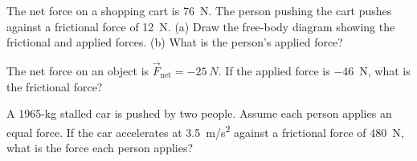 \documentclass{article}
\begin{document}
\begin{center}
\end{center}


\begin{exercise} \label{lqMcA5}
The net force on a shopping cart is \SI{76}{N}. The person pushing the cart pushes against a frictional force of \SI{12}{N}. (a) Draw the free-body diagram showing the frictional and applied forces. (b) What is the person's applied force?
\end{exercise}

\begin{exercise} \label{Og290b}
The net force on an object is $\vec{F}_{\text{net}} = \SI{-25}{N}$. If the applied force is \SI{-46}{N}, what is the frictional force? 
\end{exercise}

\begin{center}
\end{center}

\begin{exercise} \label{naDHpo}
A 1965-kg stalled car is pushed by two people. Assume each person applies an equal force. If the car accelerates at \SI{3.5}{m/s^2} against a frictional force of \SI{480}{N}, what is the force each person applies? 
\end{exercise}
\end{document}
